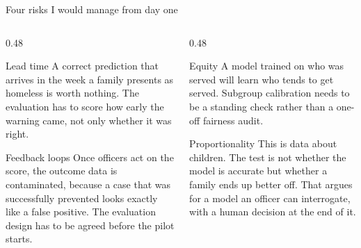 \documentclass[aspectratio=169,11pt]{beamer}
\begin{document}
\begin{frame}{Four risks I would manage from day one}
  \begin{columns}[T,onlytextwidth]
    \begin{column}{0.48\textwidth}
      \begin{block}{Lead time}
        \footnotesize A correct prediction that arrives in the week a family
        presents as homeless is worth nothing. The evaluation has to score how
        early the warning came, not only whether it was right.
      \end{block}
      \begin{block}{Feedback loops}
        \footnotesize Once officers act on the score, the outcome data is
        contaminated, because a case that was successfully prevented looks
        exactly like a false positive. The evaluation design has to be agreed
        before the pilot starts.
      \end{block}
    \end{column}
    \begin{column}{0.48\textwidth}
      \begin{block}{Equity}
        \footnotesize A model trained on who was served will learn who tends
        to get served. Subgroup calibration needs to be a standing check rather
        than a one-off fairness audit.
      \end{block}
      \begin{block}{Proportionality}
        \footnotesize This is data about children. The test is not whether
        the model is accurate but whether a family ends up better off. That
        argues for a model an officer can interrogate, with a human decision at
        the end of it.
      \end{block}
    \end{column}
  \end{columns}
\end{frame}
\end{document}
